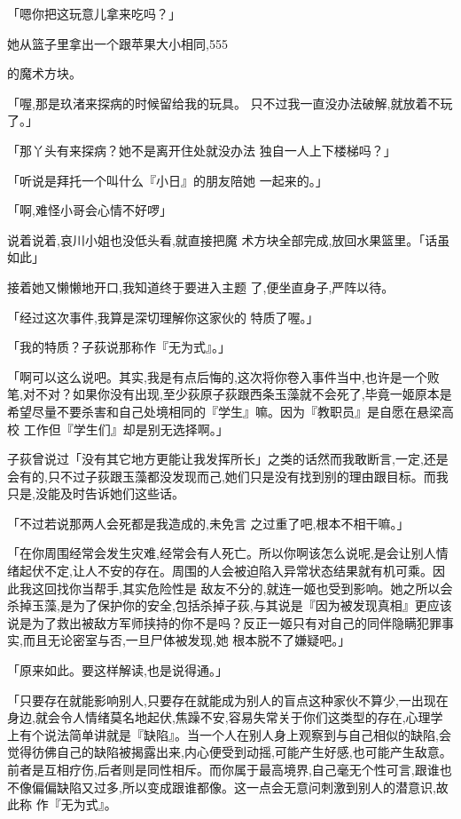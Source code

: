 \documentclass{article}
\begin{document}
「嗯你把这玩意儿拿来吃吗？」 

她从篮子里拿出一个跟苹果大小相同,555

\newpage
的魔术方块。 

「喔,那是玖渚来探病的时候留给我的玩具。
只不过我一直没办法破解,就放着不玩了。」 

「那丫头有来探病？她不是离开住处就没办法
独自一人上下楼梯吗？」 

「听说是拜托一个叫什么『小日』的朋友陪她
一起来的。」 


「啊,难怪小哥会心情不好啰」 

说着说着,哀川小姐也没低头看,就直接把魔
术方块全部完成,放回水果篮里。「话虽如此」 

接着她又懒懒地开口,我知道终于要进入主题
了,便坐直身子,严阵以待。 

「经过这次事件,我算是深切理解你这家伙的
特质了喔。」 

\newpage


「我的特质？子荻说那称作『无为式』。」 

「啊可以这么说吧。其实,我是有点后悔的,这次将你卷入事件当中,也许是一个败笔,对不对？如果你没有出现,至少荻原子荻跟西条玉藻就不会死了,毕竟一姬原本是希望尽量不要杀害和自己处境相同的『学生』嘛。因为『教职员』是自愿在悬梁高校
工作但『学生们』却是别无选择啊。」 

子荻曾说过「没有其它地方更能让我发挥所长」之类的话然而我敢断言,一定,还是会有的,只不过子荻跟玉藻都没发现而己,她们只是没有找到别的理由跟目标。而我只是,没能及时告诉她们这些话。

「不过若说那两人会死都是我造成的,未免言
之过重了吧,根本不相干嘛。」 

「在你周围经常会发生灾难,经常会有人死亡。所以你啊该怎么说呢,是会让别人情绪起伏不定,让人不安的存在。周围的人会被迫陷入异常状态结果就有机可乘。因此我这回找你当帮手,其实危险性是
\newpage
敌友不分的,就连一姬也受到影响。她之所以会杀掉玉藻,是为了保护你的安全,包括杀掉子荻,与其说是『因为被发现真相』更应该说是为了救出被敌方军师挟持的你不是吗？反正一姬只有对自己的同伴隐瞒犯罪事实,而且无论密室与否,一旦尸体被发现,她
根本脱不了嫌疑吧。」 


「原来如此。要这样解读,也是说得通。」 

「只要存在就能影响别人,只要存在就能成为别人的盲点这种家伙不算少,一出现在身边,就会令人情绪莫名地起伏,焦躁不安,容易失常关于你们这类型的存在,心理学上有个说法简单讲就是『缺陷』。当一个人在别人身上观察到与自己相似的缺陷,会觉得彷佛自己的缺陷被揭露出来,内心便受到动摇,可能产生好感,也可能产生敌意。前者是互相疗伤,后者则是同性相斥。而你属于最高境界,自己毫无个性可言,跟谁也不像偏偏缺陷又过多,所以变成跟谁都像。这一点会无意问刺激到别人的潜意识,故此称
作『无为式』。 
\end{document}
